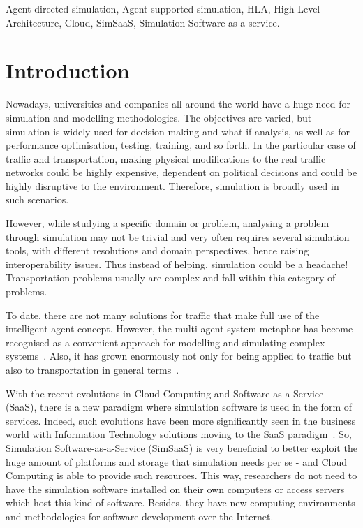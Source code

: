 \documentclass[conference]{IEEEtran}
\begin{document}
\begin{keywords}
Agent-directed simulation, Agent-supported simulation, HLA, High Level Architecture, Cloud, SimSaaS, Simulation Software-as-a-service.
\end{keywords}


%



\section{Introduction}

Nowadays, universities and companies all around the world have a huge need for simulation and modelling methodologies. The objectives are varied, but simulation is widely used for decision making and what-if analysis, as well as for performance optimisation, testing, training, and so forth. In the particular case of traffic and transportation, making physical modifications to the real traffic networks could be highly expensive, dependent on political decisions and could be highly disruptive to the environment. Therefore, simulation is broadly used in such scenarios.

However, while studying a specific domain or problem, analysing a problem through simulation may not be trivial and very often requires several simulation tools, with different resolutions and domain perspectives, hence raising interoperability issues. Thus instead of helping, simulation could be a headache! Transportation problems usually are complex and fall within this category of problems. 

To date, there are not many solutions for traffic that make full use of the intelligent agent concept. However, the multi-agent system metaphor has become recognised as a convenient approach for modelling and simulating complex systems~\cite{moya2007towards}. Also, it has grown enormously not only for being applied to traffic but also to transportation in general terms~\cite{bazzan2013review}.

With the recent evolutions in Cloud Computing and Software-as-a-Service (SaaS), there is a new paradigm where simulation software is used in the form of services. Indeed, such evolutions have been more significantly seen in the business world with Information Technology solutions moving to the SaaS paradigm~\cite{sharif2010s}. So, Simulation Software-as-a-Service (SimSaaS) is very beneficial to better exploit the huge amount of platforms and storage that simulation needs per se - and Cloud Computing is able to provide such resources. This way, researchers do not need to have the simulation software installed on their own computers or access servers which host this kind of software. Besides, they have new computing environments and methodologies for software development over the Internet.
\end{document}
